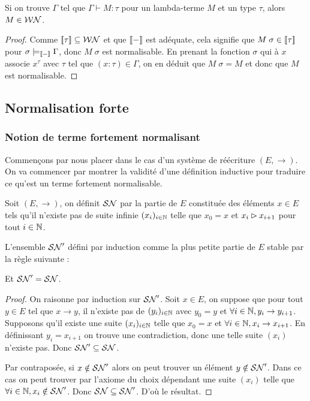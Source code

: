 \begin{cor}
    Si on trouve $\Gamma$ tel que $\Gamma\vdash M : \tau$ pour un lambda-terme $M$ et un type $\tau$, alors $M\in \WN$.
\end{cor}

\begin{proof}
    Comme $\trad\tau\subseteq\WN$ et que $\trad -$ est adéquate, cela signifie que $M\;\sigma \in \trad\tau$ pour $\sigma\models_{\trad -}\Gamma$, donc $M\;\sigma$ est normalisable. En prenant la fonction $\sigma$ qui à $x$ associe $x^\tau$ avec $\tau$ tel que $(x : \tau)\in \Gamma$, on en déduit que $M\;\sigma = M$ et donc que $M$ est normalisable.
\end{proof}

\subsection{Normalisation forte}

\subsubsection{Notion de terme fortement normalisant}

Commençons par nous placer dans le cas d'un système de réécriture $(E,\to)$. On va commencer par montrer la validité d'une définition inductive pour traduire ce qu'est un terme fortement normalisable.

\begin{defi}[Ensemble $\SN$]
    Soit $(E,\to)$, on définit $\SN$ par la partie de $E$ constituée des éléments $x\in E$ tels qu'il n'existe pas de suite infinie $(x_i)_{i\in\nat}$ telle que $x_0 = x$ et $x_i\reduc x_{i+1}$ pour tout $i\in\nat$.
\end{defi}

\begin{prop}
    L'ensemble $\SN'$ défini par induction comme la plus petite partie de $E$ stable par la règle suivante :
    \begin{center}
        \begin{prooftree}
        \end{prooftree}
    \end{center}
    Et $\SN'=\SN$.
\end{prop}

\begin{proof}
    On raisonne par induction sur $\SN'$. Soit $x\in E$, on suppose que pour tout $y\in E$ tel que $x\to y$, il n'existe pas de $(y_i)_{i\in\nat}$ avec $y_0 = y$ et $\forall i\in\nat, y_i \to y_{i+1}$. Supposons qu'il existe une suite $(x_i)_{i\in\nat}$ telle que $x_0 = x$ et $\forall i\in\nat, x_i \to x_{i+1}$. En définissant $y_i = x_{i+1}$ on trouve une contradiction, donc une telle suite $(x_i)$ n'existe pas. Donc $\SN'\subseteq \SN$.

    Par contraposée, si $x\notin\SN'$ alors on peut trouver un élément $y\notin\SN'$. Dans ce cas on peut trouver par l'axiome du choix dépendant une suite $(x_i)$ telle que $\forall i\in\nat, x_i\notin\SN'$. Donc $\SN\subseteq\SN'$. D'où le résultat.
\end{proof}

